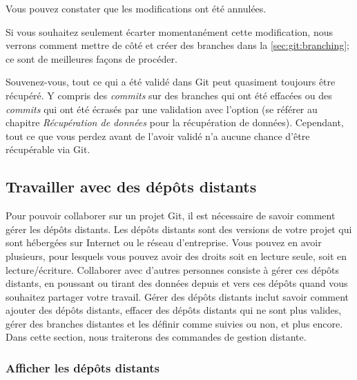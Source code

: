 Vous pouvez constater que les modifications ont été annulées.


Si vous souhaitez seulement écarter momentanément cette modification, nous verrons comment mettre de côté et créer des branches dans la \autoref{sec:git:branching}; ce sont de meilleures façons de procéder.

Souvenez-vous, tout ce qui a été validé dans Git peut quasiment toujours être récupéré.
Y compris des \emph{commits} sur des branches qui ont été effacées ou des \emph{commits} qui ont été écrasés par une validation avec l'option  (se référer au chapitre \emph{Récupération de données} pour la récupération de données).
Cependant, tout ce que vous perdez avant de l'avoir validé n'a aucune chance d'être récupérable via Git.

\subsection{Travailler avec des dépôts distants}
\label{sec:git:remote_repos}

Pour pouvoir collaborer sur un projet Git, il est nécessaire de savoir comment gérer les dépôts distants.
Les dépôts distants sont des versions de votre projet qui sont hébergées sur Internet ou le réseau d'entreprise.
Vous pouvez en avoir plusieurs, pour lesquels vous pouvez avoir des droits soit en lecture seule, soit en lecture/écriture.
Collaborer avec d'autres personnes consiste à gérer ces dépôts distants, en poussant ou tirant des données depuis et vers ces dépôts quand vous souhaitez partager votre travail.
Gérer des dépôts distants inclut savoir comment ajouter des dépôts distants, effacer des dépôts distants qui ne sont plus valides, gérer des branches distantes et les définir comme suivies ou non, et plus encore.
Dans cette section, nous traiterons des commandes de gestion distante.

\subsubsection{Afficher les dépôts distants}

